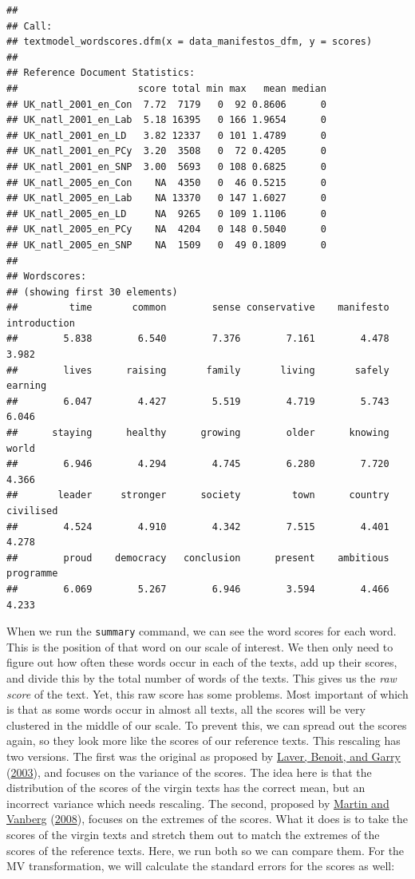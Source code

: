 \documentclass[
]{book}
\begin{document}
\begin{verbatim}
## 
## Call:
## textmodel_wordscores.dfm(x = data_manifestos_dfm, y = scores)
## 
## Reference Document Statistics:
##                     score total min max   mean median
## UK_natl_2001_en_Con  7.72  7179   0  92 0.8606      0
## UK_natl_2001_en_Lab  5.18 16395   0 166 1.9654      0
## UK_natl_2001_en_LD   3.82 12337   0 101 1.4789      0
## UK_natl_2001_en_PCy  3.20  3508   0  72 0.4205      0
## UK_natl_2001_en_SNP  3.00  5693   0 108 0.6825      0
## UK_natl_2005_en_Con    NA  4350   0  46 0.5215      0
## UK_natl_2005_en_Lab    NA 13370   0 147 1.6027      0
## UK_natl_2005_en_LD     NA  9265   0 109 1.1106      0
## UK_natl_2005_en_PCy    NA  4204   0 148 0.5040      0
## UK_natl_2005_en_SNP    NA  1509   0  49 0.1809      0
## 
## Wordscores:
## (showing first 30 elements)
##         time       common        sense conservative    manifesto introduction 
##        5.838        6.540        7.376        7.161        4.478        3.982 
##        lives      raising       family       living       safely      earning 
##        6.047        4.427        5.519        4.719        5.743        6.046 
##      staying      healthy      growing        older      knowing        world 
##        6.946        4.294        4.745        6.280        7.720        4.366 
##       leader     stronger      society         town      country    civilised 
##        4.524        4.910        4.342        7.515        4.401        4.278 
##        proud    democracy   conclusion      present    ambitious    programme 
##        6.069        5.267        6.946        3.594        4.466        4.233
\end{verbatim}

When we run the \texttt{summary} command, we can see the word scores for each word. This is the position of that word on our scale of interest. We then only need to figure out how often these words occur in each of the texts, add up their scores, and divide this by the total number of words of the texts. This gives us the \emph{raw score} of the text. Yet, this raw score has some problems. Most important of which is that as some words occur in almost all texts, all the scores will be very clustered in the middle of our scale. To prevent this, we can spread out the scores again, so they look more like the scores of our reference texts. This rescaling has two versions. The first was the original as proposed by \protect\hyperlink{ref-Laver2003a}{Laver, Benoit, and Garry} (\protect\hyperlink{ref-Laver2003a}{2003}), and focuses on the variance of the scores. The idea here is that the distribution of the scores of the virgin texts has the correct mean, but an incorrect variance which needs rescaling. The second, proposed by \protect\hyperlink{ref-Martin2008a}{Martin and Vanberg} (\protect\hyperlink{ref-Martin2008a}{2008}), focuses on the extremes of the scores. What it does is to take the scores of the virgin texts and stretch them out to match the extremes of the scores of the reference texts. Here, we run both so we can compare them. For the MV transformation, we will calculate the standard errors for the scores as well:
\end{document}
